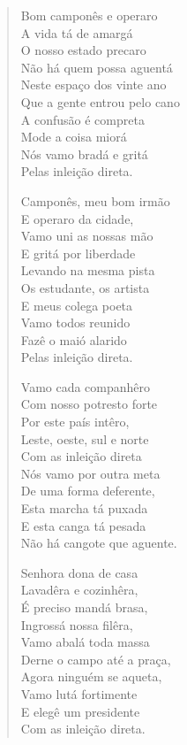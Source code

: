 \begin{verse}
Bom camponês e operaro\\
A vida tá de amargá\\
O nosso estado precaro\\
Não há quem possa aguentá\\
Neste espaço dos vinte ano\\
Que a gente entrou pelo cano\\
A confusão é compreta\\
Mode a coisa miorá\\
Nós vamo bradá e gritá\\
Pelas inleição direta.

Camponês, meu bom irmão\\
E operaro da cidade,\\
Vamo uni as nossas mão\\
E gritá por liberdade\\
Levando na mesma pista\\
Os estudante, os artista\\
E meus colega poeta\\
Vamo todos reunido\\
Fazê o maió alarido\\
Pelas inleição direta.

Vamo cada companhêro\\
Com nosso potresto forte\\
Por este país intêro,\\
Leste, oeste, sul e norte\\
Com as inleição direta\\
Nós vamo por outra meta\\
De uma forma deferente,\\
Esta marcha tá puxada\\
E esta canga tá pesada\\
Não há cangote que aguente.

Senhora dona de casa\\
Lavadêra e cozinhêra,\\
É preciso mandá brasa,\\
Ingrossá nossa filêra,\\
Vamo abalá toda massa\\
Derne o campo até a praça,\\
Agora ninguém se aqueta,\\
Vamo lutá fortimente\\
E elegê um presidente\\
Com as inleição direta.


\end{verse}
